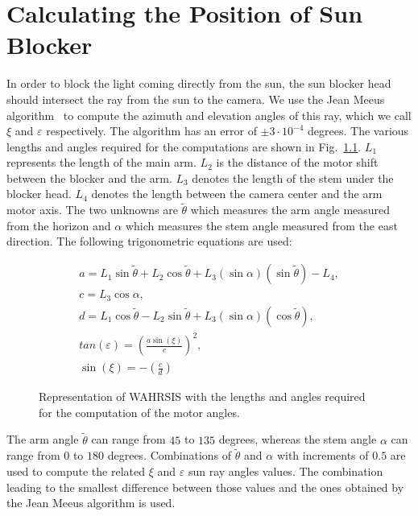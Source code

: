 
\chapter{Calculating the Position of Sun Blocker} %
\label{append:motor} %


In order to block the light coming directly from the sun, the sun blocker head should intersect the ray from the sun to the camera. We use the Jean Meeus algorithm~\cite{SPA} to compute the azimuth and elevation angles of this ray, which we call $\xi$ and $\varepsilon$ respectively. The algorithm has an error of $\pm 3\cdot 10^{-4}$ degrees. The various lengths and angles required for the computations are shown in Fig.~\ref{fig:SideTopWSI_sub}. $L_{1}$ represents the length of the main arm. $L_{2}$ is the distance of the motor shift between the blocker and the arm.  $L_{3}$ denotes the length of the stem under the blocker head. $L_{4}$ denotes the length between the camera center and the arm motor axis. The two unknowns are $\tilde{\theta}$ which measures the arm angle measured from the horizon and $\alpha$ which measures the stem angle measured from the east direction. The following trigonometric equations are used:

\begin{gather}
a=L_{1}\sin\tilde{\theta} +L_{2}\cos\tilde{\theta} +L_{3}(\sin\alpha)(\sin\tilde{\theta})-L_{4},\\
c=L_{3}\cos\alpha,\\
d=L_{1}\cos\tilde{\theta}-L_{2}\sin\tilde{\theta}+L_{3}(\sin\alpha)(\cos\tilde{\theta}),\\
tan(\varepsilon)=\left(\frac{a\sin(\xi)}{c} \right)^2,\\
\sin(\xi)=-\left(\frac{c}{d}\right)
\end{gather}



\begin{figure}[H]
\centering
{}\quad
{}
\caption{Representation of WAHRSIS with the lengths and angles required for the computation of the motor angles.\label{fig:SideTopWSI_sub}}
\end{figure}

The arm angle $\tilde{\theta}$ can range from $45$ to $135$ degrees, whereas the stem angle $\alpha$ can range from $0$ to $180$ degrees. Combinations of $\tilde{\theta}$ and $\alpha$ with increments of $0.5$ are used to compute the related $\xi$ and $\varepsilon$ sun ray angles values. The combination leading to the smallest difference between those values and the ones obtained by the Jean Meeus algorithm is used.



